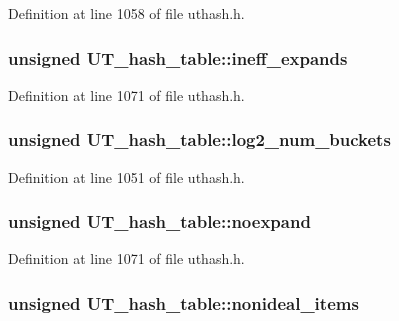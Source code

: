 Definition at line 1058 of file uthash.\-h.

\hypertarget{struct_u_t__hash__table_a216c7d98cf40a0064bee94aa8a5bf1b7}{
\subsubsection[{ineff\-\_\-expands}]{\setlength{\rightskip}{0pt plus 5cm}unsigned U\-T\-\_\-hash\-\_\-table\-::ineff\-\_\-expands}}\label{struct_u_t__hash__table_a216c7d98cf40a0064bee94aa8a5bf1b7}


Definition at line 1071 of file uthash.\-h.

\hypertarget{struct_u_t__hash__table_ae376a7f3fac525f3a9d03b6beec8d12f}{
\subsubsection[{log2\-\_\-num\-\_\-buckets}]{\setlength{\rightskip}{0pt plus 5cm}unsigned U\-T\-\_\-hash\-\_\-table\-::log2\-\_\-num\-\_\-buckets}}\label{struct_u_t__hash__table_ae376a7f3fac525f3a9d03b6beec8d12f}


Definition at line 1051 of file uthash.\-h.

\hypertarget{struct_u_t__hash__table_a635661789933752e7b83dac84430eae1}{
\subsubsection[{noexpand}]{\setlength{\rightskip}{0pt plus 5cm}unsigned U\-T\-\_\-hash\-\_\-table\-::noexpand}}\label{struct_u_t__hash__table_a635661789933752e7b83dac84430eae1}


Definition at line 1071 of file uthash.\-h.

\hypertarget{struct_u_t__hash__table_a8cb66cfb259a204cda59a815e4db664f}{
\subsubsection[{nonideal\-\_\-items}]{\setlength{\rightskip}{0pt plus 5cm}unsigned U\-T\-\_\-hash\-\_\-table\-::nonideal\-\_\-items}}\label{struct_u_t__hash__table_a8cb66cfb259a204cda59a815e4db664f}



